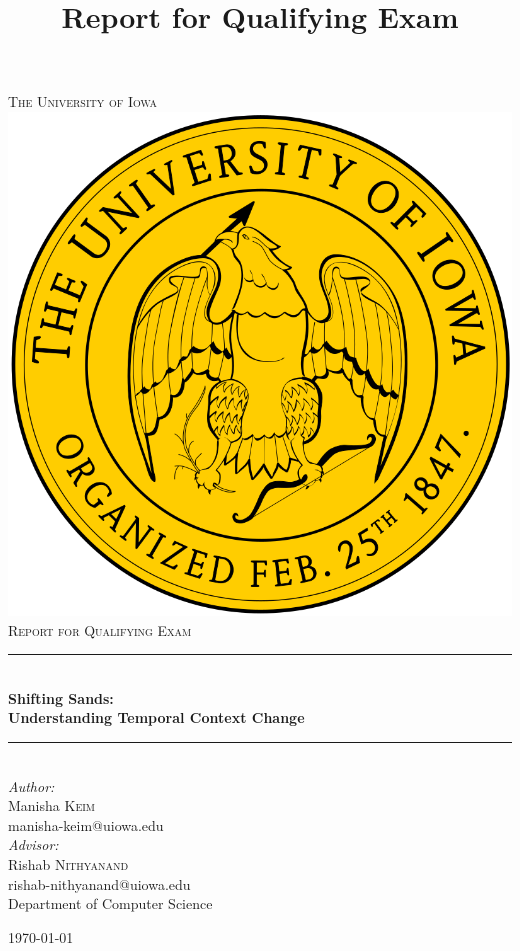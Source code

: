 
\begin{titlepage}

\newcommand{\HRule}{\rule{\linewidth}{0.5mm}}
\center

\textsc{\LARGE The University of Iowa}\\[1.5cm]
\includegraphics[scale=.1]{figures/iowa}\\[1cm]
\textsc{\Large Report for Qualifying Exam}\\[0.5cm]
\title {Report for Qualifying Exam}
\HRule \\[0.4cm]
{ \huge \bfseries Shifting Sands: \\Understanding Temporal Context Change}\\[0.4cm]
\HRule \\[1.5cm]


\emph{Author:} \\
Manisha \textsc{Keim} \\
manisha-keim@uiowa.edu \\[0.5cm]

\emph{Advisor:}\\
Rishab \textsc{Nithyanand}\\
rishab-nithyanand@uiowa.edu \\[0.5cm]

Department of Computer Science



{\today}\\[2cm]

\end{titlepage}